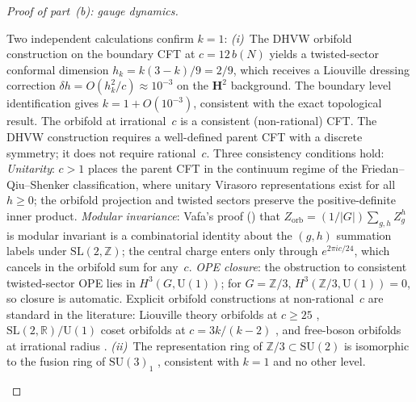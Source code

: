 \begin{proof}[Proof of part~(b): gauge dynamics]
\begin{remark}
\label{rem:dhvw-check}
Two independent calculations confirm $k = 1$:
\emph{(i)}~The DHVW orbifold construction
\citep{DixonHarveyVafaWitten1985}
on the boundary CFT at $c = 12\,b(N)$
yields a twisted-sector conformal dimension
$h_k = k(3{-}k)/9 = 2/9$,
which receives a Liouville dressing correction
$\delta h = O(h_k^2/c) \approx 10^{-3}$
on the $\mathbf{H}^2$ background.
The boundary level identification gives
$k = 1 + O(10^{-3})$, consistent with
the exact topological result.
The orbifold at irrational~$c$ is a consistent
(non-rational) CFT.
The DHVW construction requires a well-defined parent CFT
with a discrete symmetry; it does not require rational~$c$.
Three consistency conditions hold:
\emph{Unitarity}: $c > 1$ places the parent CFT
in the continuum regime of the Friedan--Qiu--Shenker
classification, where unitary Virasoro representations
exist for all~$h \ge 0$; the orbifold projection
and twisted sectors preserve the positive-definite
inner product.
\emph{Modular invariance}: Vafa's proof
(\citeyear{Vafa1986}) that
$Z_{\mathrm{orb}} = (1/|G|)\sum_{g,h}Z_g^h$
is modular invariant is a combinatorial identity
about the $(g,h)$ summation labels under
$\mathrm{SL}(2,\mathbb{Z})$; the central charge
enters only through $e^{2\pi i c/24}$, which cancels
in the orbifold sum for any~$c$.
\emph{OPE closure}: the obstruction to consistent
twisted-sector OPE lies in $H^3(G, \mathrm{U}(1))$;
for $G = \mathbb{Z}/3$,
$H^3(\mathbb{Z}/3, \mathrm{U}(1)) = 0$,
so closure is automatic.
Explicit orbifold constructions at non-rational~$c$
are standard in the literature:
Liouville theory orbifolds at $c \ge 25$
\citep{HikidaSchomerus2007},
$\mathrm{SL}(2,\mathbb{R})/\mathrm{U}(1)$ coset
orbifolds at $c = 3k/(k{-}2)$
\citep{DijkgraafVerlindeVerlinde1992},
and free-boson orbifolds at irrational radius
\citep{Ginsparg1988}.
\emph{(ii)}~The representation ring of
$\mathbb{Z}/3 \subset \mathrm{SU}(2)$
is isomorphic to the fusion ring of $\mathrm{SU}(3)_1$
\citep{CappelliItzyksonZuber1987},
consistent with $k = 1$ and no other level.
\end{remark}


\end{proof}
